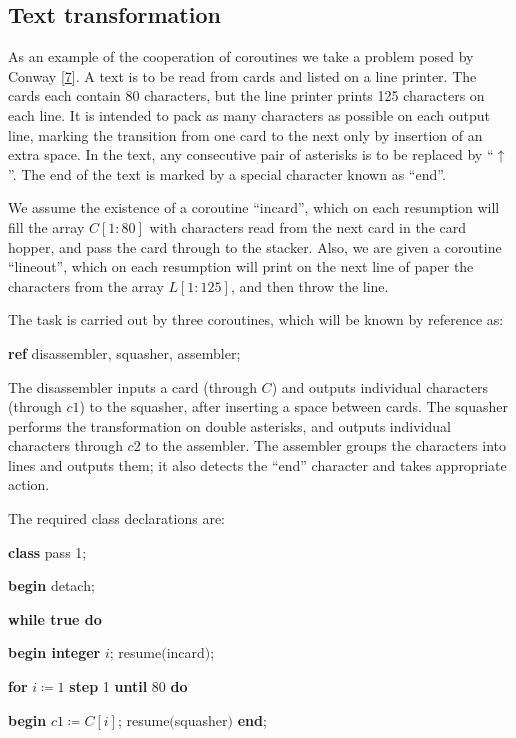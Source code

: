 \documentclass[twoside,11pt]{book}
\begin{document}
\subsection{Text transformation}

As an example of the cooperation of coroutines we take a problem posed by Conway [\hyperref[ref:7]{7}]. A text is to be read from cards and listed on a line printer. The cards each contain 80 characters, but the line printer prints 125 characters on each line. It is intended to pack as many characters as possible on each output line, marking the transition from one card to the next only by insertion of an extra space. In the text, any consecutive pair of asterisks is to be replaced by ``$\uparrow$''. The end of the text is marked by a special character known as ``end''.

We assume the existence of a coroutine ``incard'', which on each resumption will fill the array $C[1 : 80]$ with characters read from the next card in the card hopper, and pass the card through to the stacker. Also, we are given a coroutine ``lineout'', which on each resumption will print on the next line of paper the characters from the array $L[1 : 125]$, and then throw the line.

The task is carried out by three coroutines, which will be known by reference as:

\quad \textbf{ref} disassembler, squasher, assembler;

The disassembler inputs a card (through $C$) and outputs individual characters (through $c1$) to the squasher, after inserting a space between cards. The squasher performs the transformation on double asterisks, and outputs individual characters through $c2$ to the assembler. The assembler groups the characters into lines and outputs them; it also detects the ``end'' character and takes appropriate action.

The required class declarations are:

\quad \textbf{class} pass 1;

\quad \textbf{begin} detach;

\quad \quad \textbf{while true do}

\quad \quad \quad \textbf{begin integer} $i$; resume$($incard$)$;

\quad \quad \quad \quad \textbf{for} $i\coloneq 1$ \textbf{step} 1 \textbf{until} 80 \textbf{do}

\quad \quad \quad \quad \quad \textbf{begin} $c1\coloneq C[i]$; resume$($squasher$)$ \textbf{end};
\end{document}
